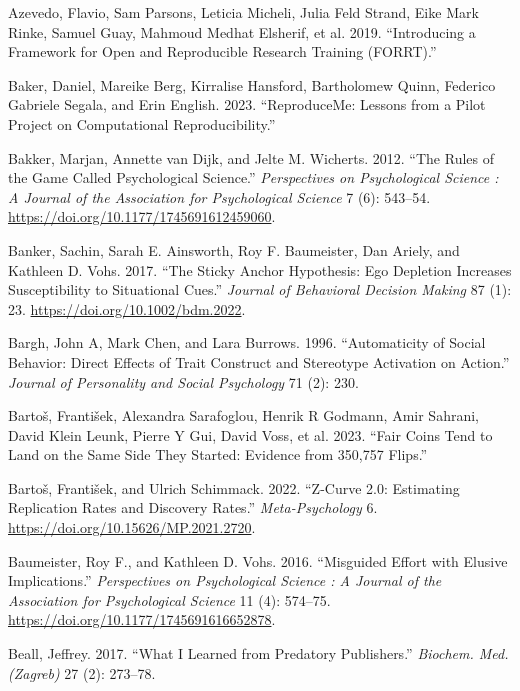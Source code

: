 \documentclass[
  letterpaper,
  DIV=11,
  numbers=noendperiod]{scrreprt}
\newlength{\cslhangindent}
\newenvironment{CSLReferences}[2] %
 {\begin{list}{}{%
  \setlength{\itemindent}{0pt}
  \setlength{\leftmargin}{0pt}
  \setlength{\parsep}{0pt}
  \ifodd #1
   \setlength{\leftmargin}{\cslhangindent}
   \setlength{\itemindent}{-1\cslhangindent}
  \fi
  \setlength{\itemsep}{#2\baselineskip}}}
 {\end{list}}
\begin{document}
\begin{CSLReferences}{1}{0}
Azevedo, Flavio, Sam Parsons, Leticia Micheli, Julia Feld Strand, Eike
Mark Rinke, Samuel Guay, Mahmoud Medhat Elsherif, et al. 2019.
{``Introducing a Framework for Open and Reproducible Research Training
({FORRT}).''}

Baker, Daniel, Mareike Berg, Kirralise Hansford, Bartholomew Quinn,
Federico Gabriele Segala, and Erin English. 2023. {``ReproduceMe:
Lessons from a Pilot Project on Computational Reproducibility.''}

Bakker, Marjan, Annette van Dijk, and Jelte M. Wicherts. 2012. {``The
Rules of the Game Called Psychological Science.''} \emph{Perspectives on
Psychological Science : A Journal of the Association for Psychological
Science} 7 (6): 543--54. \url{https://doi.org/10.1177/1745691612459060}.

Banker, Sachin, Sarah E. Ainsworth, Roy F. Baumeister, Dan Ariely, and
Kathleen D. Vohs. 2017. {``The Sticky Anchor Hypothesis: Ego Depletion
Increases Susceptibility to Situational Cues.''} \emph{Journal of
Behavioral Decision Making} 87 (1): 23.
\url{https://doi.org/10.1002/bdm.2022}.

Bargh, John A, Mark Chen, and Lara Burrows. 1996. {``Automaticity of
Social Behavior: Direct Effects of Trait Construct and Stereotype
Activation on Action.''} \emph{Journal of Personality and Social
Psychology} 71 (2): 230.

Bartoš, František, Alexandra Sarafoglou, Henrik R Godmann, Amir Sahrani,
David Klein Leunk, Pierre Y Gui, David Voss, et al. 2023. {``Fair Coins
Tend to Land on the Same Side They Started: Evidence from 350,757
Flips.''}

Bartoš, František, and Ulrich Schimmack. 2022. {``Z-Curve 2.0:
Estimating Replication Rates and Discovery Rates.''}
\emph{Meta-Psychology} 6. \url{https://doi.org/10.15626/MP.2021.2720}.

Baumeister, Roy F., and Kathleen D. Vohs. 2016. {``Misguided Effort with
Elusive Implications.''} \emph{Perspectives on Psychological Science : A
Journal of the Association for Psychological Science} 11 (4): 574--75.
\url{https://doi.org/10.1177/1745691616652878}.

Beall, Jeffrey. 2017. {``What {I} Learned from Predatory Publishers.''}
\emph{Biochem. Med. (Zagreb)} 27 (2): 273--78.


\end{CSLReferences}
\end{document}
